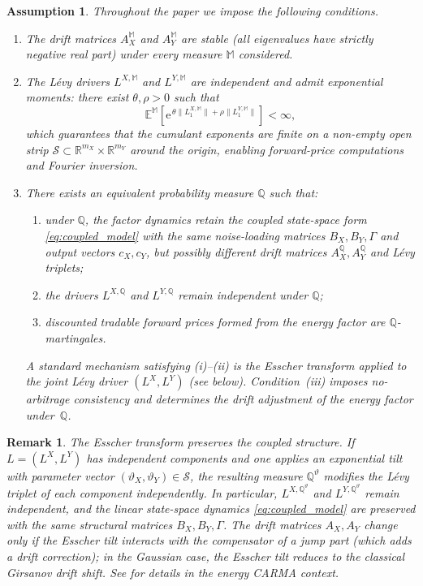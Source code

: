 \documentclass[10pt,reqno]{amsart}
\newtheorem{remark}[theorem]{Remark}
\newtheorem{assumption}[theorem]{Assumption}
\newcommand{\R}{\mathbb{R}}
\newcommand{\Q}{\mathbb{Q}}
\newcommand{\1}{\mathbbm{1}}
\newcommand{\ee}{\mathrm{e}}
\begin{document}
\begin{assumption}\label{ass:coupled_model}
Throughout the paper we impose the following conditions.
\begin{enumerate}[label=(\alph*)]
  \item\label{ass:stability} The drift matrices $A_X^{\mathbb{M}}$ and
    $A_Y^{\mathbb{M}}$ are stable (all eigenvalues have strictly negative real
    part) under every measure $\mathbb{M}$ considered.
  \item\label{ass:moments} The Lévy drivers $L^{X,\mathbb{M}}$ and
    $L^{Y,\mathbb{M}}$ are independent and admit exponential moments: there
    exist $\theta, \rho > 0$ such that
    $$
      \mathbb{E}^{\mathbb{M}}\!\left[
        \ee^{\,\theta\|L_1^{X,\mathbb{M}}\| + \rho\|L_1^{Y,\mathbb{M}}\|}
      \right] < \infty,
    $$
    which guarantees that the cumulant exponents are finite on a non-empty open
    strip $\mathcal{S} \subset \R^{m_X} \times \R^{m_Y}$ around the origin,
    enabling forward-price computations and Fourier inversion.
  \item\label{ass:pricing_measure_main} There exists an equivalent probability
    measure $\Q$ such that:
    \begin{enumerate}[label=(\roman*)]
      \item under $\Q$, the factor dynamics retain the coupled state-space form
        \eqref{eq:coupled_model} with the same noise-loading matrices $B_X,
        B_Y, \Gamma$ and output vectors $c_X, c_Y$, but possibly different
        drift matrices $A_X^\Q, A_Y^\Q$ and Lévy triplets;
      \item the drivers $L^{X,\Q}$ and $L^{Y,\Q}$ remain independent under
        $\Q$;
      \item discounted tradable forward prices formed from the energy factor are
        $\Q$-martingales.
    \end{enumerate}
    A standard mechanism satisfying (i)--(ii) is the Esscher transform applied
    to the joint Lévy driver $(L^X,L^Y)$ (see 
    below). Condition~(iii) imposes no-arbitrage consistency and determines the
    drift adjustment of the energy factor under~$\Q$.
\end{enumerate}
\end{assumption}

\begin{remark}\label{rem:esscher_preservation}
The Esscher transform preserves the coupled structure. If $L = (L^X, L^Y)$
has independent components and one applies an exponential tilt with parameter
vector $(\vartheta_X, \vartheta_Y) \in \mathcal{S}$, the resulting measure
$\Q^{\vartheta}$ modifies the Lévy triplet of each component independently.
In particular, $L^{X,\Q^\vartheta}$ and $L^{Y,\Q^\vartheta}$ remain
independent, and the linear state-space dynamics \eqref{eq:coupled_model} are
preserved with the same structural matrices $B_X, B_Y, \Gamma$. The drift
matrices $A_X, A_Y$ change only if the Esscher tilt interacts with the
compensator of a jump part (which adds a drift correction); in the Gaussian
case, the Esscher tilt reduces to the classical Girsanov drift shift. See
\citet{Ben14} for details in the energy CARMA context.
\end{remark}
\end{document}
